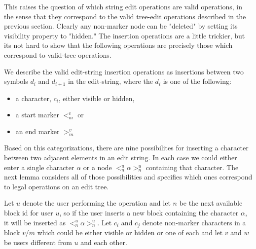 \documentclass{amsart}
\begin{document}
This raises the question of which string edit operations are valid operations,
in the sense that they correspond to the valid tree-edit operations described
in the previous section.  Clearly any non-marker node can be "deleted" by setting
its visibility property to "hidden."  The insertion operations are a little
trickier, but its not hard to show that the following operations are precisely
those which correspond to valid-tree operations. 

We describe the valid edit-string insertion operations as insertions
between two symbols $d_i$ and $d_{i+1}$ in the edit-string, where the $d_i$
is one of the following:
\begin{itemize}
\item  a character, $c_i$, either visible or hidden,
\item  a start marker $<^v_m$ or
\item an end marker $>^v_m$
\end{itemize}
Based on this categorizations, there are nine possibilites for inserting a character between two adjacent elements in an edit string. In each case we could either enter a single character $\alpha$ or a node $<^u_n \alpha >^u_n$ containing that character. The next lemma considers all of those possibilities and specifies which ones correspond to legal operations on an edit tree.

Let $u$ denote the user performing
the operation and let $n$ be the next available block id for user $u$, so if
the user inserts a new block containing the character $\alpha$, it will be inserted
as $<^u_n \alpha >^u_n$.  Let $c_i$ and $c_j$ denote non-marker characters in
a block $v/m$ 
which could be either visible or hidden or one of each and let
 $v$ and $w$ be users different from $u$ and each other.
\end{document}

